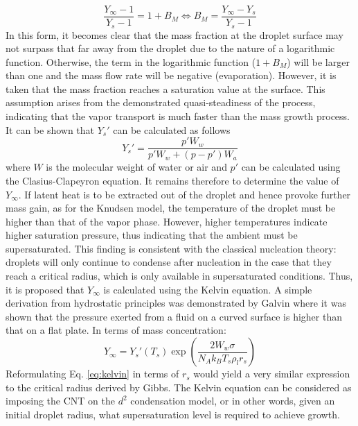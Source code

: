 \documentclass[12pt]{article}
\numberwithin{equation}{section}
\begin{document}
\begin{equation}
    \frac{Y_{\infty}-1}{Y_{s}-1}=1+B_{M}\Longleftrightarrow B_{M}=\frac{Y_{\infty}-Y_{s}}{Y_{s}-1}
\end{equation}
In this form, it becomes clear that the mass fraction at the droplet surface may not surpass that far away from the droplet due to the nature of a logarithmic function. Otherwise, the term in the logarithmic function ($1+B_{M}$) will be larger than one and the mass flow rate will be negative (evaporation). However, it is taken that the mass fraction reaches a saturation value at the surface. This assumption arises from the demonstrated quasi-steadiness of the process, indicating that the vapor transport is much faster than the mass growth process. It can be shown that $Y_{s}'$ can be calculated as follows \cite{turns2011introduction}
\begin{equation}
    Y_{s}'=\frac{p'W_{w}}{p'W_{w}+(p-p')W_{a}}
\end{equation}
where $W$ is the molecular weight of water or air and $p'$ can be calculated using the Clasius-Clapeyron equation. It remains therefore to determine the value of $Y_{\infty}$. If latent heat is to be extracted out of the droplet and hence provoke further mass gain, as for the Knudsen model, the temperature of the droplet must be higher than that of the vapor phase. However, higher temperatures indicate higher saturation pressure, thus indicating that the ambient must be supersaturated. This finding is consistent with the classical nucleation theory: droplets will only continue to condense after nucleation in the case that they reach a critical radius, which is only available in supersaturated conditions. Thus, it is proposed that $Y_{\infty}$ is calculated using the Kelvin equation. A simple derivation from hydrostatic principles was demonstrated by Galvin \cite{GALVIN20054659} where it was shown that the pressure exerted from a fluid on a curved surface is higher than that on a flat plate. In terms of mass concentration:
\begin{equation}\label{eq:kelvin}
    Y_{\infty}=Y_{s}'(T_{s})\exp\left(\frac{2W_{w}\sigma}{N_{A}k_{B}T_{s}\rho_{l}r_{s}}\right)
\end{equation}
Reformulating Eq. \ref{eq:kelvin} in terms of $r_{s}$ would yield a very similar expression to the critical radius derived by Gibbs. The Kelvin equation can be considered as imposing the CNT on the $d^2$ condensation model, or in other words, given an initial droplet radius, what supersaturation level is required to achieve growth. 
\end{document}
